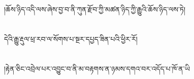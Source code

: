།ཆོས་ཉིད་འདི་ལས་ཞེས་བྱ་བ་ནི་ཀུན་རྫོབ་ཀྱི་མཚན་ཉིད་ཀྱི་རྒྱུའི་ཆོས་ཉིད་ལས་ཏེ།\chapter{ }དེའི་རྒྱུ་རྡུལ་ཕྲ་རབ་ལ་སོགས་པ་སྔར་དཔྱད་ཟིན་པའི་ཕྱིར་རོ།\chapter{ }།རྟེན་ཅིང་འབྲེལ་པར་འབྱུང་བ་ནི་མ་བརྟགས་ན་ཉམས་དགའ་བར་འདོད་པ་ཁོ་ན་ཡི